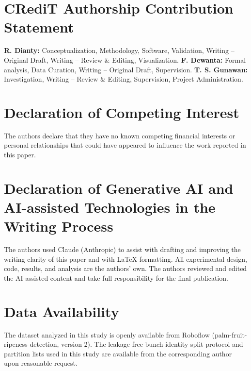 \documentclass[9pt,twocolumn]{extarticle}
\begin{document}
\section*{CRediT Authorship Contribution Statement}

\textbf{R. Dianty:} Conceptualization, Methodology, Software, Validation, Writing -- Original Draft, Writing -- Review \& Editing, Visualization. \textbf{F. Dewanta:} Formal analysis, Data Curation, Writing -- Original Draft, Supervision. \textbf{T. S. Gunawan:} Investigation, Writing -- Review \& Editing, Supervision, Project Administration.

\section*{Declaration of Competing Interest}

The authors declare that they have no known competing financial interests or personal relationships that could have appeared to influence the work reported in this paper.

\section*{Declaration of Generative AI and AI-assisted Technologies in the Writing Process}

The authors used Claude (Anthropic) to assist with drafting and improving the writing clarity of this paper and with LaTeX formatting. All experimental design, code, results, and analysis are the authors' own. The authors reviewed and edited the AI-assisted content and take full responsibility for the final publication.

\section*{Data Availability}

The dataset analyzed in this study is openly available from Roboflow (palm-fruit-ripeness-detection, version 2). The leakage-free bunch-identity split protocol and partition lists used in this study are available from the corresponding author upon reasonable request.
\end{document}
